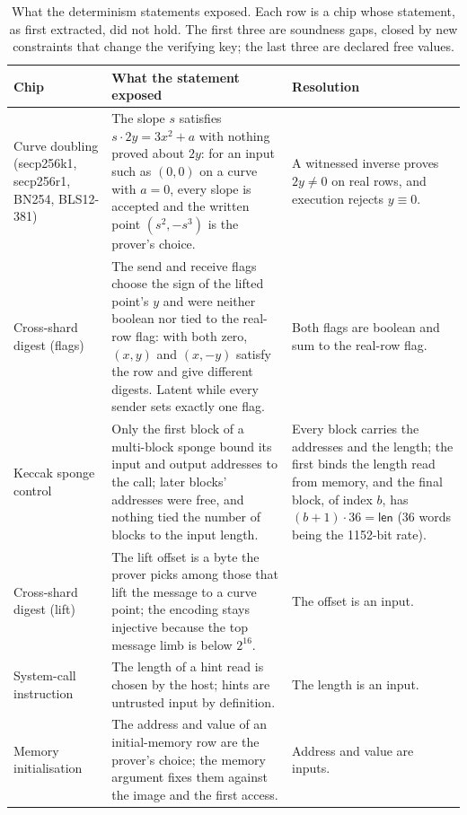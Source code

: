 \begin{table}[t]
\centering
\small
\caption{What the determinism statements exposed. Each row is a chip whose statement, as first extracted, did not hold. The first three are soundness gaps, closed by new constraints that change the verifying key; the last three are declared free values.}
\label{tab:det-findings}
\begin{tabular}{@{}>{\raggedright\arraybackslash}p{2.9cm}>{\raggedright\arraybackslash}p{7.3cm}>{\raggedright\arraybackslash}p{5.0cm}@{}}
\toprule
Chip & What the statement exposed & Resolution \\
\midrule
Curve doubling (secp256k1, secp256r1, BN254, BLS12-381) &
  The slope $s$ satisfies $s \cdot 2y = 3x^2 + a$ with nothing proved about $2y$: for an input such as $(0,0)$ on a curve with $a = 0$, every slope is accepted and the written point $(s^2, -s^3)$ is the prover's choice. &
  A witnessed inverse proves $2y \neq 0$ on real rows, and execution rejects $y \equiv 0$. \\
\addlinespace
Cross-shard digest (flags) &
  The send and receive flags choose the sign of the lifted point's $y$ and were neither boolean nor tied to the real-row flag: with both zero, $(x, y)$ and $(x, -y)$ satisfy the row and give different digests. Latent while every sender sets exactly one flag. &
  Both flags are boolean and sum to the real-row flag. \\
\addlinespace
Keccak sponge control &
  Only the first block of a multi-block sponge bound its input and output addresses to the call; later blocks' addresses were free, and nothing tied the number of blocks to the input length. &
  Every block carries the addresses and the length; the first binds the length read from memory, and the final block, of index $b$, has $(b+1) \cdot 36 = \mathsf{len}$ (36 words being the 1152-bit rate). \\
\midrule
Cross-shard digest (lift) &
  The lift offset is a byte the prover picks among those that lift the message to a curve point; the encoding stays injective because the top message limb is below $2^{16}$. &
  The offset is an input. \\
\addlinespace
System-call instruction &
  The length of a hint read is chosen by the host; hints are untrusted input by definition. &
  The length is an input. \\
\addlinespace
Memory initialisation &
  The address and value of an initial-memory row are the prover's choice; the memory argument fixes them against the image and the first access. &
  Address and value are inputs. \\
\bottomrule
\end{tabular}
\end{table}
